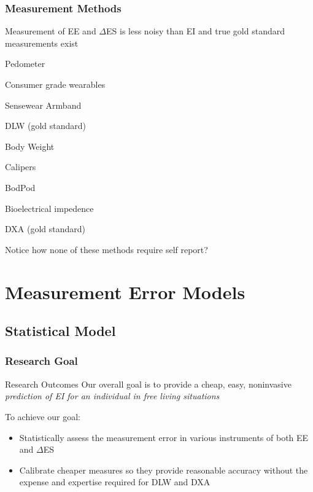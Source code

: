 \documentclass[handout]{beamer}\usepackage[]{graphicx}\usepackage[]{color}
\begin{document}
\begin{frame}
\frametitle{Measurement Methods}

Measurement of EE and $\Delta$ES is less noisy than EI and true gold standard measurements exist

\begin{itemize}
\begin{multicols}{2}
\item Pedometer
\item Consumer grade wearables
\item Sensewear Armband
\item DLW (gold standard)

\columnbreak
\item Body Weight
\item Calipers
\item BodPod
\item Bioelectrical impedence
\item DXA (gold standard)
\end{multicols}
\end{itemize}

Notice how none of these methods require self report? 

\end{frame}



\section{Measurement Error Models}
\subsection{Statistical Model}

\begin{frame}
\frametitle{Research Goal}

\begin{block}{Research Outcomes}
Our overall goal is to provide a cheap, easy, noninvasive \emph{prediction of EI for an individual in free living situations}
\end{block}

To achieve our goal:

\begin{itemize}
\item
Statistically assess the measurement error in various instruments of both EE and $\Delta$ES
\item 
Calibrate cheaper measures so they provide reasonable accuracy without the expense and expertise required for DLW and DXA
\end{itemize}

\end{frame}
\end{document}
